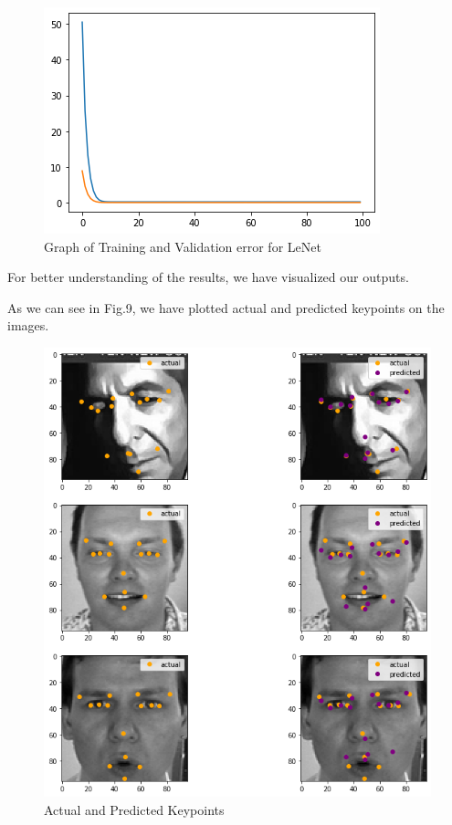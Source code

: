 \documentclass[conference]{IEEEtran}
\begin{document}
\begin{figure}[h!]
    \centering
    \includegraphics[scale=0.6]{LeNEt.png}
    \caption{Graph of Training and Validation error for LeNet}
    \label{fig:my_label}
\end{figure}
    
For better understanding of the results, we have visualized our outputs.

As we can see in Fig.9, we have plotted actual and predicted keypoints on the images.

\begin{figure}[h!]
    \centering
    \includegraphics[scale=0.4]{ValidationImagesRealAndPredicted.png}
    \caption{Actual and Predicted Keypoints}
    \label{fig:my_label}
\end{figure}
\end{document}
